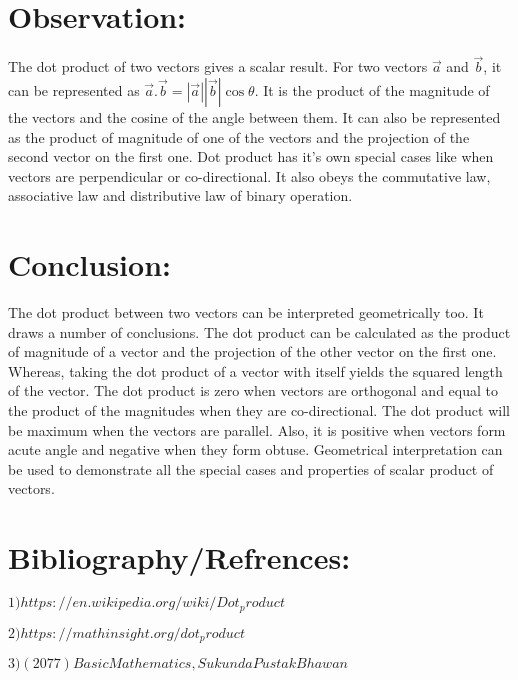 \documentclass[11pt]{article}
\begin{document}
\section{Observation:}
The dot product of two vectors gives a scalar result. For two vectors $\overrightarrow{a}$ and $\overrightarrow{b}$, it can be represented as $\overrightarrow{a}.\overrightarrow{b}=|\overrightarrow{a}| |\overrightarrow{b}| \cos \theta$. It is the product of the magnitude of the vectors and the cosine of the angle between them. It can also be represented as the product of magnitude of one of the vectors and the projection of the second vector on the first one. Dot product has it's own special cases like when vectors are perpendicular or co-directional. It also obeys the commutative law, associative law and distributive law of binary operation.

\section{Conclusion:}
The dot product between two vectors can be interpreted geometrically too. It draws a number of conclusions. The dot product can be calculated as the product of magnitude of a vector and the projection of the other vector on the first one. Whereas, taking the dot product of a vector with itself yields the squared length of the vector. The dot product is zero when vectors are orthogonal and equal to the product of the magnitudes when they are co-directional. The dot product will be maximum when the vectors are parallel. Also, it is positive when vectors form acute angle and negative when they form obtuse. Geometrical interpretation can be used to demonstrate all the special cases and properties of scalar product of vectors.
\newpage
\section{Bibliography/Refrences:}
$
1) https://en.wikipedia.org/wiki/Dot_product$ 


$2) https://mathinsight.org/dot_product$


$3) (2077) Basic Mathematics, Sukunda Pustak Bhawan$




\end{document}
